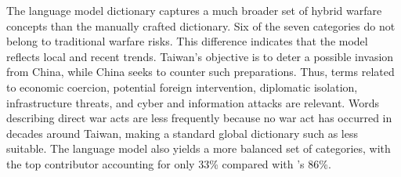 The language model dictionary captures a much broader set of hybrid warfare
concepts than the manually crafted dictionary. Six of the seven categories do
not belong to traditional warfare risks. This difference indicates that the
model reflects local and recent trends. Taiwan's objective is to deter a
possible invasion from China, while China seeks to counter such preparations.
Thus, terms related to economic coercion, potential foreign intervention,
diplomatic isolation, infrastructure threats, and cyber and information
attacks are relevant. Words describing direct war acts are less frequently
because no war act has occurred in decades around Taiwan, making a standard
global dictionary such as \citet{caldara} less suitable.
The language model also yields a more balanced set of categories, with the top
contributor accounting for only 33\% compared with \citet{lau}'s 86\%.

